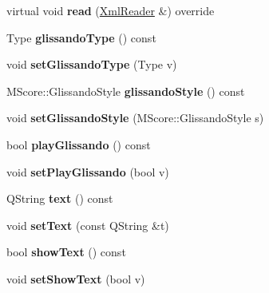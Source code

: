\begin{DoxyCompactItemize}
virtual void {\bfseries read} (\hyperlink{class_ms_1_1_xml_reader}{Xml\+Reader} \&) override
\item 
\mbox{\label{class_ms_1_1_glissando_a0dc0a188e094c2bc4f2a3d57077e7743}} 
Type {\bfseries glissando\+Type} () const
\item 
\mbox{\label{class_ms_1_1_glissando_a96e5c95486fc9db4f70249a6e3b558f8}} 
void {\bfseries set\+Glissando\+Type} (Type v)
\item 
\mbox{\label{class_ms_1_1_glissando_a1cd5c1094bfff103468d5e0c66fbb8e8}} 
M\+Score\+::\+Glissando\+Style {\bfseries glissando\+Style} () const
\item 
\mbox{\label{class_ms_1_1_glissando_a4779de5f3ba100945d7d3e85668c9b7e}} 
void {\bfseries set\+Glissando\+Style} (M\+Score\+::\+Glissando\+Style s)
\item 
\mbox{\label{class_ms_1_1_glissando_ab3d9d49e4fee80dc5f59aea7b3b73acc}} 
bool {\bfseries play\+Glissando} () const
\item 
\mbox{\label{class_ms_1_1_glissando_a12796119f42197f3bf7fef4116103094}} 
void {\bfseries set\+Play\+Glissando} (bool v)
\item 
\mbox{\label{class_ms_1_1_glissando_a6cdcf829ed734b5aa2a0a768c704134b}} 
Q\+String {\bfseries text} () const
\item 
\mbox{\label{class_ms_1_1_glissando_a48de18c7d6ee17175c483e1d382bd7fa}} 
void {\bfseries set\+Text} (const Q\+String \&t)
\item 
\mbox{\label{class_ms_1_1_glissando_a4a990b956982fd6c2c453d40bdb9d292}} 
bool {\bfseries show\+Text} () const
\item 
\mbox{\label{class_ms_1_1_glissando_ac51a22a361a1609122827e556fde2517}} 
void {\bfseries set\+Show\+Text} (bool v)
\item 
\mbox{\label{class_ms_1_1_glissando_a32cd654bd2fecfc56e7de31eb9cd07d8}} 

\end{DoxyCompactItemize}
